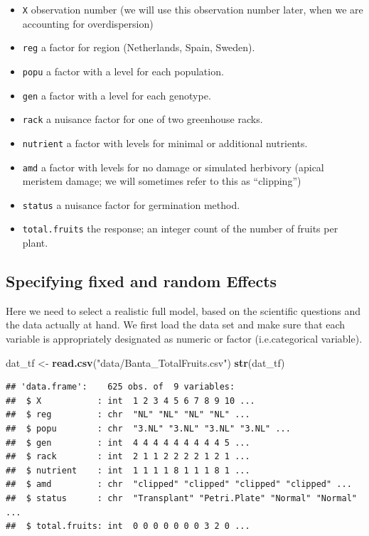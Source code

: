 \documentclass[
  12pt,
]{book}
\newenvironment{Shaded}{\begin{snugshade}}{\end{snugshade}}
\newcommand{\KeywordTok}[1]{\textcolor[rgb]{0.13,0.29,0.53}{\textbf{#1}}}
\newcommand{\NormalTok}[1]{#1}
\newcommand{\StringTok}[1]{\textcolor[rgb]{0.31,0.60,0.02}{#1}}
\providecommand{\tightlist}{%
  \setlength{\itemsep}{0pt}\setlength{\parskip}{0pt}}
\begin{document}
\begin{itemize}
\tightlist
\item
  \texttt{X} observation number (we will use this observation number later, when we are accounting for overdispersion)
\item
  \texttt{reg} a factor for region (Netherlands, Spain, Sweden).
\item
  \texttt{popu} a factor with a level for each population.
\item
  \texttt{gen} a factor with a level for each genotype.
\item
  \texttt{rack} a nuisance factor for one of two greenhouse racks.
\item
  \texttt{nutrient} a factor with levels for minimal or additional nutrients.
\item
  \texttt{amd} a factor with levels for no damage or simulated herbivory (apical meristem damage; we will sometimes refer to this as ``clipping'')
\item
  \texttt{status} a nuisance factor for germination method.
\item
  \texttt{total.fruits} the response; an integer count of the number of fruits per plant.
\end{itemize}

\hypertarget{specifying-fixed-and-random-effects}{%
\subsection{Specifying fixed and random Effects}\label{specifying-fixed-and-random-effects}}

Here we need to select a realistic full model, based on the scientific questions and the data actually at hand. We first load the data set and make sure that each variable is appropriately designated as numeric or factor (i.e.categorical variable).

\begin{Shaded}
\begin{Highlighting}[]
\NormalTok{dat\_tf \textless{}{-}}\StringTok{ }\KeywordTok{read.csv}\NormalTok{(}\StringTok{"data/Banta\_TotalFruits.csv"}\NormalTok{)}
\KeywordTok{str}\NormalTok{(dat\_tf)}
\end{Highlighting}
\end{Shaded}

\begin{verbatim}
## 'data.frame':    625 obs. of  9 variables:
##  $ X           : int  1 2 3 4 5 6 7 8 9 10 ...
##  $ reg         : chr  "NL" "NL" "NL" "NL" ...
##  $ popu        : chr  "3.NL" "3.NL" "3.NL" "3.NL" ...
##  $ gen         : int  4 4 4 4 4 4 4 4 4 5 ...
##  $ rack        : int  2 1 1 2 2 2 2 1 2 1 ...
##  $ nutrient    : int  1 1 1 1 8 1 1 1 8 1 ...
##  $ amd         : chr  "clipped" "clipped" "clipped" "clipped" ...
##  $ status      : chr  "Transplant" "Petri.Plate" "Normal" "Normal" ...
##  $ total.fruits: int  0 0 0 0 0 0 0 3 2 0 ...
\end{verbatim}
\end{document}
